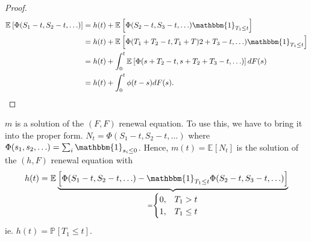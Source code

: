 \begin{proof}
	\begin{align}
		\mathbb{E}_{} \left[ \Phi(S_1 - t, S_2-t, \ldots) \right] 
		&= h(t) + \mathbb{E}_{} \left[ \Phi(S_2 -t, S_3-t,\ldots)\mathbbm{1}_{T_1 \leq t}  \right] \\
		&= h(t) + \mathbb{E}_{} \left[ \Phi(T_1 + T_2 - t, T_1+T)2 + T_3 -t, \ldots)\mathbbm{1}_{T_1\leq t}\right] \\ 
		&= h(t) + \int_{0}^{t} \mathbb{E}_{} \left[ \Phi(s+T_2 -t, s+T_2+T_3-t,\ldots) \right] dF(s) \\
		&= h(t) + \int_{0}^{t} \phi(t-s)dF(s).
	\end{align}
\end{proof}

\begin{ex}[Application 1]
	$m$ is a solution of the $(F,F)$ renewal equation. {\color{blue}To use this, we have to bring it into the proper form.} $N_t = \Phi(S_1-t, S_2-t,\ldots)$ where $\Phi(s_1,s_2,\ldots) = \sum_{i}^{} \mathbbm{1}_{s_i\leq 0} $. Hence, $m(t) = \mathbb{E}_{} \left[ N_t \right]$ is the solution of the $(h,F)$ renewal equation with
	\begin{align}
		h(t) = \mathbb{E}_{} \underbrace{\left[ \Phi(S_1-t, S_2-t,\ldots) - \mathbbm{1}_{T_1\leq t} \Phi(S_2-t, S_3-t, \ldots)  \right]}_{=
	\begin{cases}
		0, &T_1>t \\
		1, &T_1\leq t
	\end{cases}
}
	\end{align}
	ie. $h(t) = \mathbb{P}_{} \left[ T_1 \leq t \right] $.	
\end{ex}


